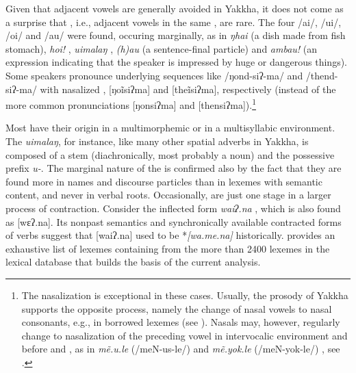 Given that adjacent vowels are generally avoided in Yakkha, it does not come as a surprise that , i.e., adjacent vowels in the same , are rare. The four  /ai/, /ui/, /oi/ and /au/ were found, occuring marginally, as in \emph{ŋhai} (a dish made from fish stomach), \emph{hoi!} ,  \emph{uimalaŋ} , \emph{(h)au} (a sentence-final  particle) and \emph{ambau!} (an   expression indicating that the speaker is impressed by huge or dangerous things). Some speakers pronounce underlying sequences like /ŋond-siʔ-ma/ and /thend-siʔ-ma/ with nasalized , [ŋoĩsiʔma] and [theĩsiʔma], respectively (instead of the more common pronunciations [ŋonsiʔma] and [thensiʔma]).\footnote{The nasalization is exceptional in these cases. Usually, the prosody of Yakkha supports the opposite process, namely the change of nasal vowels to nasal consonants, e.g., in borrowed  lexemes (see ). Nasals may, however, regularly change to nasalization of the preceding vowel in intervocalic environment and before  and , as in \emph{mẽ.u.le} (/meN-us-le/)   and \emph{mẽ.yok.le} (/meN-yok-le/) , see .} 

Most  have their origin in a multimorphemic or in a multisyllabic environment. The  \emph{uimalaŋ}, for instance, like many other spatial adverbs in Yakkha, is composed of a stem (diachronically, most probably a noun) and the possessive prefix \emph{u-}. The marginal nature of the  is confirmed also by the fact  that they are found more in names and discourse particles than in lexemes with semantic content, and never in verbal roots. Occasionally,  are just one stage in a larger process of contraction. Consider the inflected form \emph{waiʔ.na} , which is also found as [wɛʔ.na]. Its nonpast semantics and synchronically available contracted forms of verbs suggest that [waiʔ.na]  used to be *\emph{[wa.me.na] } historically.  provides an exhaustive list of lexemes containing  from the more than 2400 lexemes in the lexical database that builds the basis of the current analysis.



